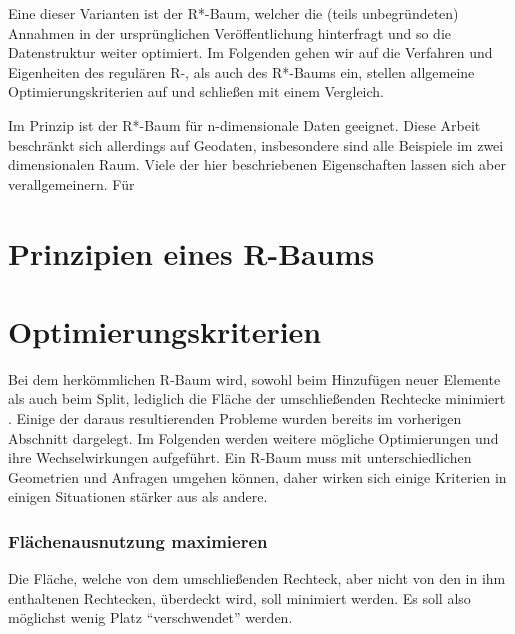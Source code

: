 \documentclass[runningheads,a4paper]{llncs}
\begin{document}
	Eine dieser Varianten ist der R*-Baum, welcher die (teils unbegründeten) Annahmen in der ursprünglichen Veröffentlichung hinterfragt und so die Datenstruktur weiter optimiert. Im Folgenden gehen wir auf die Verfahren und Eigenheiten des regulären R-, als auch des R*-Baums ein, stellen allgemeine Optimierungskriterien auf und schließen mit einem Vergleich.

	Im Prinzip ist der R*-Baum für n-dimensionale Daten geeignet. Diese Arbeit beschränkt sich allerdings auf Geodaten, insbesondere sind alle Beispiele im zwei dimensionalen Raum. Viele der hier beschriebenen Eigenschaften lassen sich aber verallgemeinern. Für 


\section{Prinzipien eines R-Baums} %
\label{sec:prinzipien_eines_r_baums}



\section{Optimierungskriterien} %
\label{sec:optimierungskriterien}

	Bei dem herkömmlichen R-Baum wird, sowohl beim Hinzufügen neuer Elemente als auch beim Split, lediglich die Fläche der umschließenden Rechtecke minimiert \citep[vgl.][50-51]{Guttman:1984}. Einige der daraus resultierenden Probleme wurden bereits im vorherigen Abschnitt dargelegt.
	Im Folgenden werden weitere mögliche Optimierungen und ihre Wechselwirkungen aufgeführt. Ein R-Baum muss mit unterschiedlichen Geometrien und Anfragen umgehen können, daher wirken sich einige Kriterien in einigen Situationen stärker aus als andere.

	\subsubsection{Flächenausnutzung maximieren} %
	\label{ssub:flaechenausnutzung}

	Die Fläche, welche von dem umschließenden Rechteck, aber nicht von den in ihm enthaltenen Rechtecken, überdeckt wird, soll minimiert werden. Es soll also möglichst wenig Platz \enquote{verschwendet} werden. \citep[vgl.][323]{Beckmann:1990}

\end{document}
